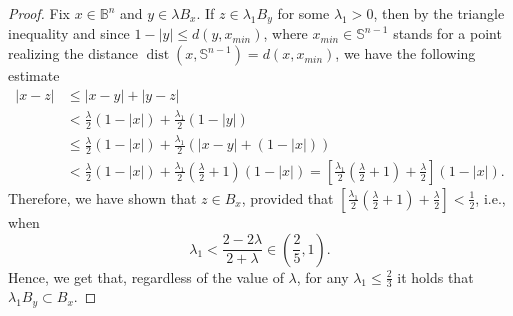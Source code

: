 \documentclass[11pt,a4paper,reqno]{amsart}
\theoremstyle{definition}
\newcommand{\B}{\mathbb{B}^n}
\newcommand{\dist}{\operatorname{dist}}
\newcommand{\Sn}{\mathbb{S}^{n-1}}
\numberwithin{komcounter}{section}
\begin{document}
\begin{proof}
	Fix $x\in \B$ and $y\in\lambda B_x$. If $z\in \lambda_1 B_y$ for some $\lambda_1>0$, then by the triangle inequality and since $1-|y|\leq d(y, x_{min})$, where $x_{min}\in \Sn$ stands for a point realizing the distance $\dist(x,\Sn)=d(x, x_{min})$, we have the following estimate
	\begin{align*}
 		|x-z|&\leq |x-y|+|y-z| \nonumber \\
 		&< \frac{\lambda}{2}(1-|x|)+\frac{\lambda_1}{2}(1-|y|) \nonumber \\
 		&\leq \frac{\lambda}{2}(1-|x|)+\frac{\lambda_1}{2}( |x-y|+(1-|x|)) \nonumber \\
 		&< \frac{\lambda}{2}(1-|x|)+\frac{\lambda_1}{2}\left(\frac{\lambda}{2}+1\right)(1-|x|)=\left[\frac{\lambda_1}{2}\left(\frac{\lambda}{2}+1\right) +\frac{\lambda}{2}\right](1-|x|). %
	\end{align*}
	Therefore, we have shown that $z\in B_x$, provided that $\left[\frac{\lambda_1}{2}\left(\frac{\lambda}{2}+1\right) +\frac{\lambda}{2}\right]<\frac{1}{2}$, i.e., when 
	$$
	\lambda_1 < \frac{2-2\lambda}{2+\lambda}\in\left(\frac{2}{5},1\right).
	$$
	Hence, we get that, regardless of the value of $\lambda$, for any $\lambda_1\leq\frac{2}{3}$ it holds that $\lambda_1B_y\subset B_x$.

\smallskip
	

\end{proof}
\end{document}
